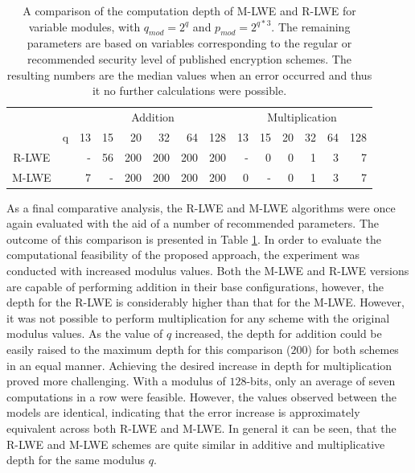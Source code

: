 \begin{table}[htp]
  \centering
  \caption[M-LWE and R-LWE computation depth comparison]{A comparison of the computation depth of M-LWE and R-LWE for variable modules, with $q_{mod} = 2^q$ and $p_{mod}=2^{q*3}$. The remaining parameters are based on variables corresponding to the regular or recommended security level of published encryption schemes. The resulting numbers are the median values when an error occurred and thus it no further calculations were possible.}
  
  \begin{tabular}{|cc|rrrrrr|rrrrrr|}
    \toprule
                                       &   & \multicolumn{6}{|c|}{Addition} & \multicolumn{6}{|c|}{Multiplication}                                                        \\
                                       & q & 13                             & 15                                   & 20  & 32  & 64  & 128 & 13 & 15 & 20 & 32 & 64 & 128 \\
    \midrule
    R-LWE  \cite{CyrstalsKyber}        &   & -                              & 56                                   & 200 & 200 & 200 & 200 & -  & 0  & 0  & 1  & 3  & 7   \\
    M-LWE  \cite{PracticalKeyExchange} &   & 7                              & -                                    & 200 & 200 & 200 & 200 & 0  & -  & 0  & 1  & 3  & 7   \\
    \bottomrule
  \end{tabular}
  \label{table:depthComparison}
\end{table}

As a final comparative analysis, the R-LWE and M-LWE algorithms were once again evaluated with the aid of a number of recommended parameters. The outcome of this comparison is presented in Table \ref{table:depthComparison}. In order to evaluate the computational feasibility of the proposed approach, the experiment was conducted with increased modulus values. Both the M-LWE and R-LWE versions are capable of performing addition in their base configurations, however, the depth for the R-LWE is considerably higher than that for the M-LWE. However, it was not possible to perform multiplication for any scheme with the original modulus values. As the value of $q$ increased, the depth for addition could be easily raised to the maximum depth for this comparison ($200$) for both schemes in an equal manner. Achieving the desired increase in depth for multiplication proved more challenging. With a modulus of $128$-bits, only an average of seven computations in a row were feasible. However, the values observed between the models are identical, indicating that the error increase is approximately equivalent across both R-LWE and M-LWE. In general it can be seen, that the R-LWE and M-LWE schemes are quite similar in additive and multiplicative depth for the same modulus $q$.

